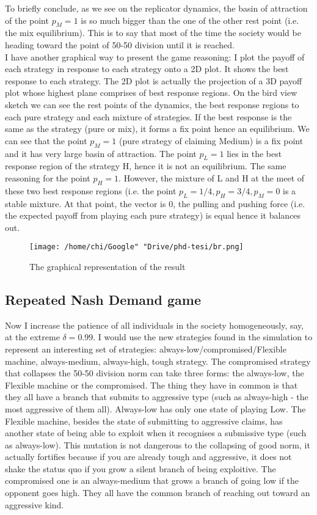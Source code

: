\documentclass[12.5pt]{report}
\begin{document}
To briefly conclude, as we see on the replicator dynamics, the basin of attraction of the point $p_M = 1$ is so much bigger than the one of the other rest point (i.e. the mix equilibrium). This is to say that most of the time the society would be heading toward the point of 50-50 division until it is reached.\\ 

I have another graphical way to present the game reasoning: I plot the payoff of each strategy in response to each strategy onto a 2D plot. It shows the best response to each strategy. The 2D plot is actually the projection of a 3D payoff plot whose highest plane comprises of best response regions. On the bird view sketch we can see the rest points of the dynamics, the best response regions to each pure strategy and each mixture of strategies. If the best response is the same as the strategy (pure or mix), it forms a fix point hence an equilibrium. We can see that the point $p_M = 1$ (pure strategy of claiming Medium) is a fix point and it has very large basin of attraction. The point $p_L = 1$ lies in the best response region of the strategy H, hence it is not an equilibrium. The same reasoning for the point $p_H = 1$. However, the mixture of L and H at the meet of these two best response regions (i.e. the point $p_L = 1/4, p_H = 3/4, p_M = 0$ is a stable mixture. At that point, the vector is 0, the pulling and pushing force (i.e. the expected payoff from playing each pure strategy) is equal hence it balances out.

\begin{figure}[h!]
\texttt{[image: /home/chi/Google" "Drive/phd-tesi/br.png]}
\caption{The graphical representation of the result}
\end{figure}

\subsection{Repeated Nash Demand game}

Now I increase the patience of all individuals in the society homogeneously, say, at the extreme $\delta = 0.99$. I would use the new strategies found in the simulation to represent an interesting set of strategies: always-low/compromised/Flexible machine, always-medium, always-high, tough strategy. The compromised strategy that collapses the 50-50 division norm can take three forms: the always-low, the Flexible machine or the compromised. The thing they have in common is that they all have a branch that submits to aggressive type (such as always-high - the most aggressive of them all). Always-low has only one state of playing Low. The Flexible machine, besides the state of submitting to aggressive claims, has another state of being able to exploit when it recognises a submissive type (such as always-low). This mutation is not dangerous to the collapsing of good norm, it actually fortifies because if you are already tough and aggressive, it does not shake the status quo if you grow a silent branch of being exploitive. The compromised one is an always-medium that grows a branch of going low if the opponent goes high. They all have the common branch of reaching out toward an aggressive kind.
\end{document}
